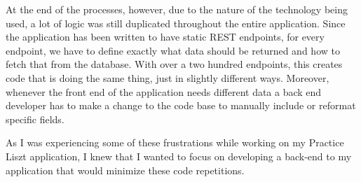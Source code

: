 At the end of the processes, however, due to the nature of the technology being used, a lot of logic was still duplicated throughout the entire application.  Since the application has been written to have static REST endpoints, for every endpoint, we have to define exactly what data should be returned and how to fetch that from the database. With over a two hundred endpoints, this creates code that is doing the same thing, just in slightly different ways.  Moreover, whenever the front end of the application needs different data a back end developer has to make a change to the code base to manually include or reformat specific fields.

As I was experiencing some of these frustrations while working on my Practice Liszt application, I knew that I wanted to focus on developing a back-end to my application that would minimize these code repetitions.